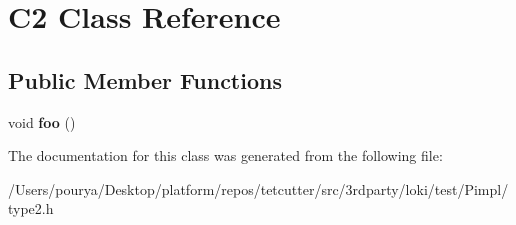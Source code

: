\hypertarget{classC2}{}\section{C2 Class Reference}
\label{classC2}
\subsection*{Public Member Functions}
\begin{DoxyCompactItemize}
\item 
\hypertarget{classC2_aa14c1abd373ad03828aa9cb5abf7173c}{}void {\bfseries foo} ()\label{classC2_aa14c1abd373ad03828aa9cb5abf7173c}

\end{DoxyCompactItemize}


The documentation for this class was generated from the following file\+:\begin{DoxyCompactItemize}
\item 
/\+Users/pourya/\+Desktop/platform/repos/tetcutter/src/3rdparty/loki/test/\+Pimpl/type2.\+h\end{DoxyCompactItemize}
